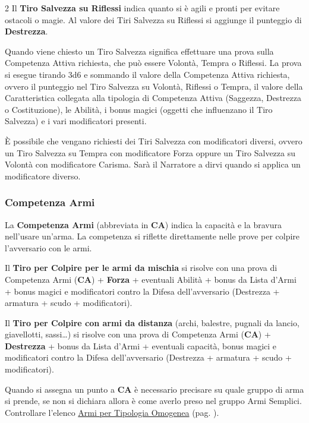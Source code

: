 \begin{multicols}{2}
Il \textbf{Tiro Salvezza su Riflessi} indica quanto si è agili e pronti per evitare ostacoli o magie. Al valore dei Tiri Salvezza su Riflessi si aggiunge il punteggio di \textbf{Destrezza}.

Quando viene chiesto un Tiro Salvezza significa effettuare una prova sulla Competenza Attiva richiesta, che può essere Volontà, Tempra o Riflessi.
La prova si esegue tirando 3d6 e sommando il valore della Competenza Attiva richiesta, ovvero il punteggio nel Tiro Salvezza su Volontà, Riflessi o Tempra, il valore della Caratteristica collegata alla tipologia di Competenza Attiva (Saggezza, Destrezza o Costituzione), le Abilità, i bonus magici (oggetti che influenzano il Tiro Salvezza) e i vari modificatori presenti.

\medskip

\begin{giocatore}
È possibile che vengano richiesti dei Tiri Salvezza con modificatori diversi, ovvero un Tiro Salvezza su Tempra con modificatore Forza oppure un Tiro Salvezza su Volontà con modificatore Carisma. Sarà il Narratore a dirvi quando si applica un modificatore diverso.
\end{giocatore}

\subsubsection{Competenza Armi}\label{competenzaarmi}

La \textbf{Competenza Armi} (abbreviata in \textbf{CA}) indica la capacità e la bravura nell'usare un'arma. La competenza si riflette direttamente nelle prove per colpire l'avversario con le armi.

Il \textbf{Tiro per Colpire per le armi da mischia} si risolve con una prova di Competenza Armi (\textbf{CA}) + \textbf{Forza} + eventuali Abilità + bonus da Lista d'Armi + bonus magici e modificatori contro la Difesa dell'avversario (Destrezza + armatura + scudo + modificatori).

Il \textbf{Tiro per Colpire con armi da distanza} (archi, balestre, pugnali da lancio, giavellotti, sassi…) si risolve con una prova di Competenza Armi (\textbf{CA}) + \textbf{Destrezza} + bonus da Lista d'Armi + eventuali capacità, bonus magici e modificatori contro la Difesa dell'avversario (Destrezza + armatura + scudo + modificatori).

Quando si assegna un punto a \textbf{CA} è necessario precisare su quale gruppo di arma si prende, se non si dichiara allora è come averlo preso nel gruppo Armi Semplici.
Controllare l'elenco \hyperlink{lista.armi}{Armi per Tipologia Omogenea} (pag. \pageref{lista.armi}).


\end{multicols}
